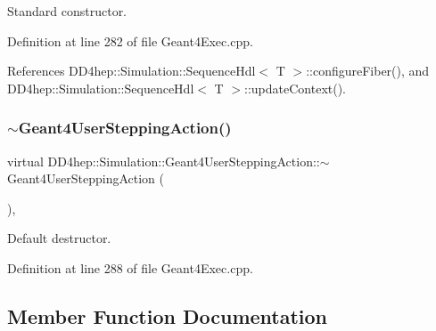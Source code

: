 Standard constructor. 



Definition at line 282 of file Geant4\+Exec.\+cpp.



References D\+D4hep\+::\+Simulation\+::\+Sequence\+Hdl$<$ T $>$\+::configure\+Fiber(), and D\+D4hep\+::\+Simulation\+::\+Sequence\+Hdl$<$ T $>$\+::update\+Context().

\hypertarget{class_d_d4hep_1_1_simulation_1_1_geant4_user_stepping_action_a7c9e7f202db5ebf3300c1d2c6d9aa1d2}{}\label{class_d_d4hep_1_1_simulation_1_1_geant4_user_stepping_action_a7c9e7f202db5ebf3300c1d2c6d9aa1d2} 
\subsubsection{\texorpdfstring{$\sim$\+Geant4\+User\+Stepping\+Action()}{~Geant4UserSteppingAction()}}
{\footnotesize\ttfamily virtual D\+D4hep\+::\+Simulation\+::\+Geant4\+User\+Stepping\+Action\+::$\sim$\+Geant4\+User\+Stepping\+Action (\begin{DoxyParamCaption}{ }\end{DoxyParamCaption})\hspace{0.3cm}{\ttfamily [inline]}, {\ttfamily [virtual]}}



Default destructor. 



Definition at line 288 of file Geant4\+Exec.\+cpp.



\subsection{Member Function Documentation}
\hypertarget{class_d_d4hep_1_1_simulation_1_1_geant4_user_stepping_action_a459952dec8bab794c933b464471d7b60}{}\label{class_d_d4hep_1_1_simulation_1_1_geant4_user_stepping_action_a459952dec8bab794c933b464471d7b60} 
